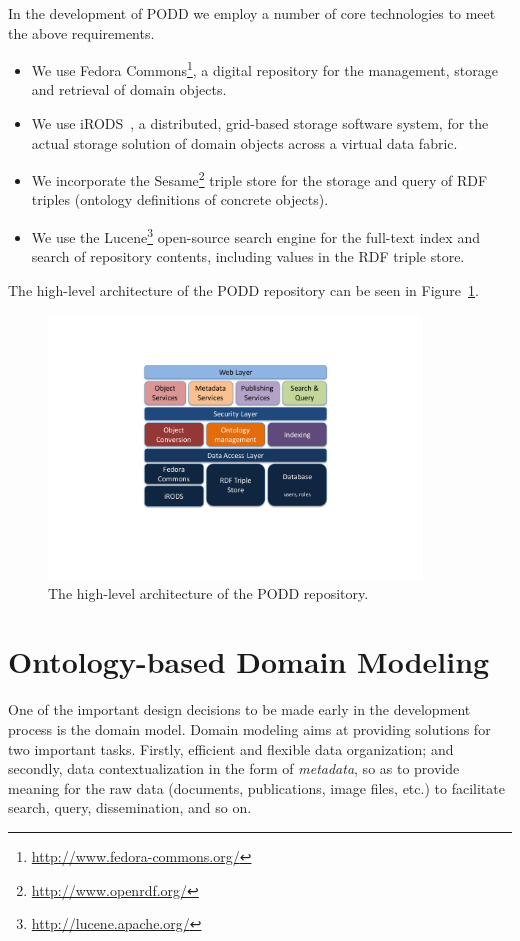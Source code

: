 \documentclass{llncs}
\begin{document}
In the development of PODD we employ a number of core technologies
to meet the above requirements.

\begin{itemize}
\item We use Fedora Commons\footnote{\url{http://www.fedora-commons.org/}}, a digital
repository for the management, storage and retrieval of domain
objects.

\item We use iRODS~\cite{irods07}, a distributed, grid-based storage
software system, for the actual storage solution of domain objects
across a virtual data fabric.

\item We incorporate the Sesame\footnote{\url{http://www.openrdf.org/}}
triple store for the storage and query of RDF triples (ontology
definitions of concrete objects).

\item We use the Lucene\footnote{\url{http://lucene.apache.org/}}
open-source search engine for the full-text index and search of repository
contents, including values in the RDF triple store.
\end{itemize}

The high-level architecture of the PODD repository can be seen in
Figure~\ref{fig:arch}.

\begin{figure}[htb]
\centering
\includegraphics[trim = 45mm 50mm 45mm 40mm, clip,height=70mm]{architecture.pdf}
\vspace{-16pt} \caption{The high-level architecture of the PODD
repository.}\label{fig:arch}
\end{figure}

\section{Ontology-based Domain Modeling}\label{sec:ont}
One of the important design decisions to be made early in the
development process is the domain model. Domain modeling aims at
providing solutions for two important tasks. Firstly, efficient and
flexible data organization; and secondly, data contextualization in
the form of \emph{metadata}, so as to provide meaning for the raw
data (documents, publications, image files, etc.) to facilitate
search, query, dissemination, and so on.
\end{document}
